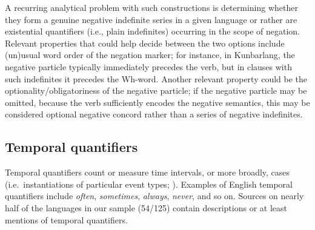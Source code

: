 \documentclass[12pt,egregdoesnotlikesansseriftitles]{scrartcl}
\newcommand{\ofy}{/125} %
\begin{document}
 A recurring analytical problem with such constructions is determining whether they form a genuine negative indefinite series in a given language or rather are existential quantifiers (i.e., plain indefinites) occurring in the scope of negation. Relevant properties that could help decide between the two options include (un)usual word order of the negation marker; for instance, in Kunbarlang, the negative particle typically immediately precedes the verb, but in clauses with such indefinites it precedes the Wh-word. Another relevant property could be the optionality/obligatoriness of the negative particle; if the negative particle may be omitted, because the verb sufficiently encodes the negative semantics, this may be considered optional negative concord rather than a series of negative indefinites.


\subsection{Temporal quantifiers}
\label{sec:tempq}
Temporal quantifiers count or measure time intervals, or more broadly, cases (i.e.\ instantiations of particular event types; \citealt{lewis75}). Examples of English temporal quantifiers include \textit{often}, \textit{sometimes}, \textit{always}, \textit{never}, and so on.  Sources on nearly half of the languages in our sample (54\ofy) contain descriptions or at least mentions of temporal quantifiers. 
\end{document}
